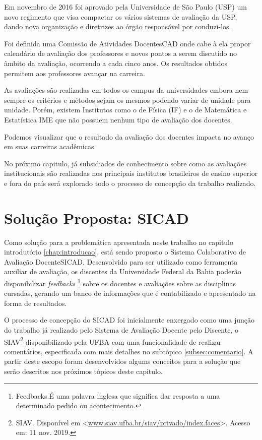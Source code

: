 \documentclass[12pt, a4paper]{report}
\begin{document}
Em novembro de 2016 foi aprovado pela Universidade de São Paulo (USP) um novo regimento que visa compactar os vários sistemas de avaliação da USP, dando nova organização e diretrizes ao órgão responsável por conduzi-los.

Foi definida uma Comissão de Atividades Docentes\ac{CAD} onde cabe à ela propor calendário de avaliação dos professores e novos pontos a serem discutido no âmbito da avaliação, ocorrendo a cada cinco anos. Os resultados obtidos permitem aos professores avançar na carreira.

As avaliações são realizadas em todos os campus da universidades embora nem sempre os critérios e métodos sejam os mesmos podendo variar de unidade para unidade. Porém, existem Institutos como o de Física (IF) e o de Matemática e Estatística \ac{IME} que não possuem nenhum tipo de avaliação dos docentes.

Podemos visualizar que o resultado da avaliação dos docentes impacta no avanço em suas carreiras acadêmicas.

No próximo capitulo, já subsidiados de conhecimento sobre como as avaliações institucionais são realizadas nos principais institutos brasileiros de ensino superior e fora do país será explorado todo o processo de concepção da trabalho realizado.


\chapter{Solução Proposta: SICAD}
\label{chap:solucaoproposta}

Como solução para a problemática apresentada neste trabalho no capitulo introdutório \ref{chap:introducao}, está sendo proposto o Sistema Colaborativo de Avaliação Docente\ac{SICAD}. Desenvolvido para ser utilizado como ferramenta auxiliar de avaliação, os discentes da Universidade Federal da Bahia poderão disponibilizar \textit{feedbacks} \footnote{Feedbacks.É uma palavra inglesa que significa dar resposta a uma determinado pedido ou acontecimento.} sobre os docentes e avaliações sobre as disciplinas cursadas, gerando um banco de informações que é contabilizado e apresentado na forma de resultados. 

O processo de concepção do \ac{SICAD} foi inicialmente enxergado como uma junção do trabalho já realizado pelo Sistema de Avaliação Docente pelo Discente, o \ac{SIAV}\footnote{SIAV. Disponível em <\url{www.siav.ufba.br/siav/privado/index.faces}>. Acesso em: 11 nov. 2019.} disponibilizado pela \ac{UFBA} com uma funcionalidade de realizar comentários, especificada com mais detalhes no subtópico \ref{subsec:comentario}. A partir deste escopo foram desenvolvidos algums conceitos para a solução que serão descritos nos próximos tópicos deste capitulo.
\end{document}
